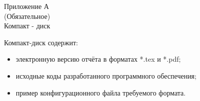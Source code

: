 \begin{center}
Приложение А\\

(Обязательное)\\

Компакт - диск
\end{center}

Компакт-диск содержит: 
\begin{itemize}
\item электронную версию отчёта в форматах *.tex и *.pdf;
\item исходные коды разработанного программного обеспечения;
\item пример конфигурационного файла требуемого формата.
\end{itemize}